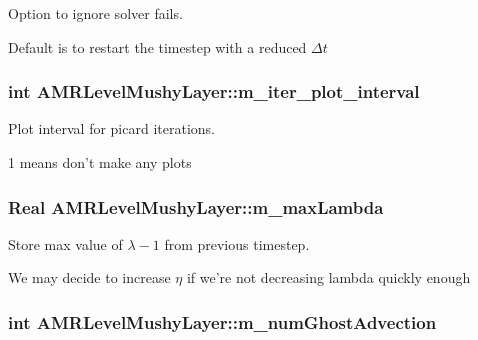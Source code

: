 Option to ignore solver fails. 

Default is to restart the timestep with a reduced $ \Delta t$ \hypertarget{class_a_m_r_level_mushy_layer_a1b88cc852494c1537cd7e5fbc01bae53}{
\subsubsection[{m\-\_\-iter\-\_\-plot\-\_\-interval}]{\setlength{\rightskip}{0pt plus 5cm}int A\-M\-R\-Level\-Mushy\-Layer\-::m\-\_\-iter\-\_\-plot\-\_\-interval\hspace{0.3cm}{\ttfamily [protected]}}}\label{class_a_m_r_level_mushy_layer_a1b88cc852494c1537cd7e5fbc01bae53}


Plot interval for picard iterations. 

1 means don't make any plots \hypertarget{class_a_m_r_level_mushy_layer_a49000dfb8d30dc44b35fc1c802c9fd4c}{
\subsubsection[{m\-\_\-max\-Lambda}]{\setlength{\rightskip}{0pt plus 5cm}Real A\-M\-R\-Level\-Mushy\-Layer\-::m\-\_\-max\-Lambda\hspace{0.3cm}{\ttfamily [protected]}}}\label{class_a_m_r_level_mushy_layer_a49000dfb8d30dc44b35fc1c802c9fd4c}


Store max value of $ \lambda-1 $ from previous timestep. 

We may decide to increase $ \eta $ if we're not decreasing lambda quickly enough \hypertarget{class_a_m_r_level_mushy_layer_a5ac61ca83db82c5642e21d7cbe83f37b}{
\subsubsection[{m\-\_\-num\-Ghost\-Advection}]{\setlength{\rightskip}{0pt plus 5cm}int A\-M\-R\-Level\-Mushy\-Layer\-::m\-\_\-num\-Ghost\-Advection\hspace{0.3cm}{\ttfamily [protected]}}}\label{class_a_m_r_level_mushy_layer_a5ac61ca83db82c5642e21d7cbe83f37b}


